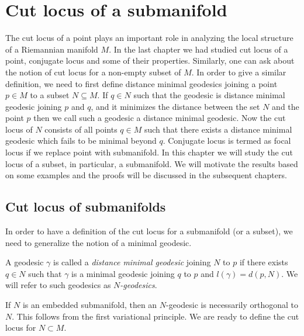 \chapter[Cut locus of a submanifold]{Cut locus of a submanifold}
\minitoc

\hf The cut locus of a point plays an important role in analyzing the local structure of a Riemannian manifold $M$. In the last chapter we had studied cut locus of a point, conjugate locus and some of their properties. Similarly, one can ask about the notion of cut locus for a non-empty subset of $M$. In order to give a similar definition, we need to first define distance minimal geodesics joining a point $p\in M$ to a subset $N\subseteq M$. If $q\in N$ such that the geodesic is distance minimal geodesic joining $p$ and $q$, and it minimizes the distance between the set $N$ and the point $p$ then we call such a geodesic a distance minimal geodesic. Now the cut locus of $N$ consists of all points $q\in M$ such that there exists a distance minimal geodesic which fails to be minimal beyond $q$. Conjugate locus is termed as focal locus if we replace point with submanifold. In this chapter we will study the cut locus of a subset, in particular, a submanifold. We will motivate the results based on some examples and the proofs will be discussed in the subsequent chapters.

\section{Cut locus of submanifolds}\label{sec:cutLocusOfSubmanifolds}
\hfb In order to have a definition of the cut locus for a submanifold (or a subset), we need to generalize the notion of a minimal geodesic.
\begin{defn}\label{distmin}
    A geodesic $\gamma $ is called a \emph{distance minimal geodesic} joining $N$ to $p$ if there exists $q\in N$ such that $\gamma$ is a minimal geodesic joining $q$ to $p$ and $l(\gamma)= d(p,N) $. We will refer to such geodesics as \textit{$N$-geodesics}.
\end{defn}
\vspace{0.3cm}
\noindent If $N$ is an embedded submanifold, then an $N$-geodesic is necessarily orthogonal to $N$. This follows from the first variational principle. We are ready to define the cut locus for $N\subset M$. 

